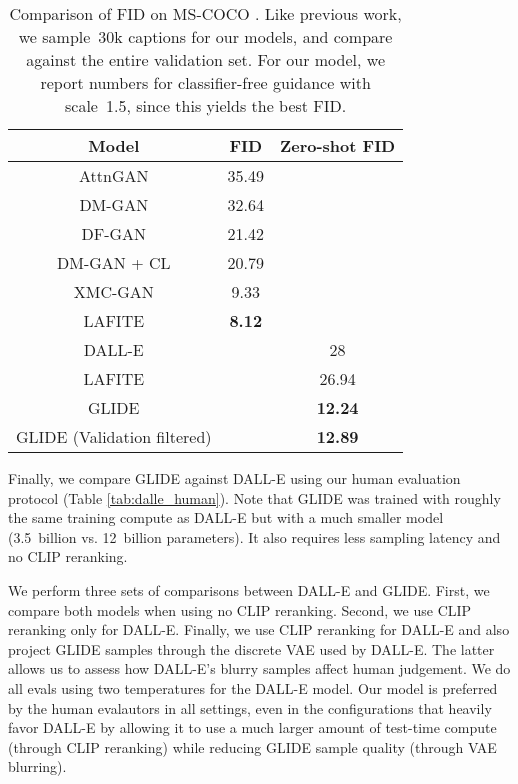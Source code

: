 \documentclass{article}
\newcommand{\modelname}{GLIDE}
\begin{document}
\begin{table}[t]
    \caption{Comparison of FID on MS-COCO . Like previous work, we sample~30k captions for our models, and compare against the entire validation set. For our model, we report numbers for classifier-free guidance with scale~1.5, since this yields the best FID.}
    \label{tab:mscoco_fids}
    \vskip 0.15in
    \centering
    \begin{center}
    \begin{small}
    \begin{tabular}{ccc}
    \toprule
    Model & FID & Zero-shot FID \\
    \midrule
    AttnGAN \citep{attngan} & 35.49 & \\
    DM-GAN \citep{dmgan} & 32.64 & \\
    DF-GAN \citep{dfgan} & 21.42 & \\
    DM-GAN + CL \citep{textcl} & 20.79 & \\
    XMC-GAN \citep{xmcgan} & 9.33 & \\
    LAFITE \citep{lafite} & \textbf{8.12} & \\
    \midrule
    DALL-E \citep{dalle} & &  28 \\
    LAFITE \citep{lafite} & & 26.94 \\
    \modelname{} & & \textbf{12.24} \\
    \modelname{} (Validation filtered) & & \textbf{12.89} \\
    \bottomrule
    \end{tabular}
    \end{small}
    \end{center}
    \vskip -0.2in
\end{table}

Finally, we compare \modelname{} against DALL-E using our human evaluation protocol (Table \ref{tab:dalle_human}). Note that \modelname{} was trained with roughly the same training compute as DALL-E but with a much smaller model (3.5~billion vs. 12~billion parameters). It also requires less sampling latency and no CLIP reranking. 

We perform three sets of comparisons between DALL-E and \modelname{}. First, we compare both models when using no CLIP reranking. Second, we use CLIP reranking only for DALL-E. Finally, we use CLIP reranking for DALL-E and also project \modelname{} samples through the discrete VAE used by DALL-E. The latter allows us to assess how DALL-E's blurry samples affect human judgement. We do all evals using two temperatures for the DALL-E model. Our model is preferred by the human evalautors in all settings, even in the configurations that heavily favor DALL-E by allowing it to use a much larger amount of test-time compute (through CLIP reranking) while reducing \modelname{} sample quality (through VAE blurring).
\end{document}
